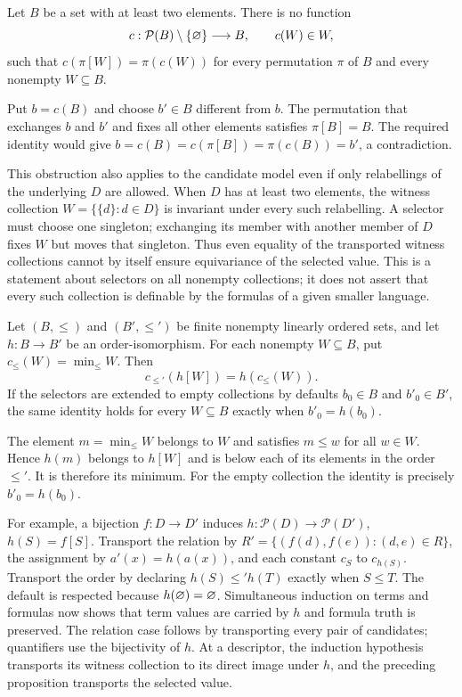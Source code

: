 \begin{proposition}
Let $B$ be a set with at least two elements. There is no function
\[
c:\mathcal P(B)\setminus\{\varnothing\}\longrightarrow B,
\qquad c(W)\in W,
\]
such that $c(\pi[W])=\pi(c(W))$ for every permutation $\pi$ of $B$
and every nonempty $W\subseteq B$.
\end{proposition}
\Proof
Put $b=c(B)$ and choose $b'\in B$ different from $b$. The permutation
that exchanges $b$ and $b'$ and fixes all other elements satisfies
$\pi[B]=B$. The required identity would give
$b=c(B)=c(\pi[B])=\pi(c(B))=b'$, a contradiction.
\Done

This obstruction also applies to the candidate model even if only
relabellings of the underlying $D$ are allowed. When $D$ has at least
two elements, the witness collection
$W=\{\{d\}:d\in D\}$ is invariant under every such relabelling.
A selector must choose one singleton; exchanging its member with
another member of $D$ fixes $W$ but moves that singleton. Thus even
equality of the transported witness collections cannot by itself ensure
equivariance of the selected value. This is a statement about selectors
on all nonempty collections; it does not assert that every such
collection is definable by the formulas of a given smaller language.

\begin{proposition}
Let $(B,\leq)$ and $(B',\leq')$ be finite nonempty linearly ordered
sets, and let $h:B\to B'$ be an order-isomorphism. For each nonempty
$W\subseteq B$, put $c_{\leq}(W)=\min_{\leq}W$. Then
\[
c_{\leq'}(h[W])=h(c_{\leq}(W)).
\]
If the selectors are extended to empty collections by defaults
$b_0\in B$ and $b'_0\in B'$, the same identity holds for every
$W\subseteq B$ exactly when $b'_0=h(b_0)$.
\end{proposition}
\Proof
The element $m=\min_{\leq}W$ belongs to $W$ and satisfies $m\leq w$
for all $w\in W$. Hence $h(m)$ belongs to $h[W]$ and is below each
of its elements in the order $\leq'$. It is therefore its minimum.
For the empty collection the identity is precisely $b'_0=h(b_0)$.
\Done

For example, a bijection $f:D\to D'$ induces
$h:\mathcal P(D)\to\mathcal P(D')$, $h(S)=f[S]$.
Transport the relation by
$R'=\{(f(d),f(e)):(d,e)\in R\}$, the assignment by
$a'(x)=h(a(x))$, and each constant $c_S$ to $c_{h(S)}$.
Transport the order by declaring $h(S)\leq' h(T)$ exactly when
$S\leq T$. The default is respected because $h(\varnothing)=\varnothing$.
Simultaneous induction on terms and formulas now shows that term
values are carried by $h$ and formula truth is preserved. The relation
case follows by transporting every pair of candidates; quantifiers
use the bijectivity of $h$. At a descriptor, the induction hypothesis
transports its witness collection to its direct image under $h$, and
the preceding proposition transports the selected value.

